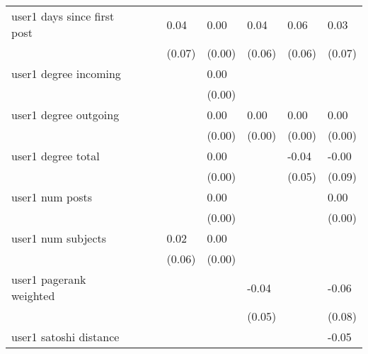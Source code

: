 \begin{table}
\begin{center}
\begin{tabular}{llllllll}
user1 days since first post                    &          &            & 0.04    & 0.00        & 0.04     & 0.06               & 0.03    \\
                                               &          &            & (0.07)  & (0.00)      & (0.06)   & (0.06)             & (0.07)  \\
user1 degree incoming                          &          &            &         & 0.00        &          &                    &         \\
                                               &          &            &         & (0.00)      &          &                    &         \\
user1 degree outgoing                          &          &            &         & 0.00        & 0.00     & 0.00               & 0.00    \\
                                               &          &            &         & (0.00)      & (0.00)   & (0.00)             & (0.00)  \\
user1 degree total                             &          &            &         & 0.00        &          & -0.04              & -0.00   \\
                                               &          &            &         & (0.00)      &          & (0.05)             & (0.09)  \\
user1 num posts                                &          &            &         & 0.00        &          &                    & 0.00    \\
                                               &          &            &         & (0.00)      &          &                    & (0.00)  \\
user1 num subjects                             &          &            & 0.02    & 0.00        &          &                    &         \\
                                               &          &            & (0.06)  & (0.00)      &          &                    &         \\
user1 pagerank weighted                        &          &            &         &             & -0.04    &                    & -0.06   \\
                                               &          &            &         &             & (0.05)   &                    & (0.08)  \\
user1 satoshi distance                         &          &            &         &             &          &                    & -0.05   \\

\end{tabular}
\end{center}
\end{table}
